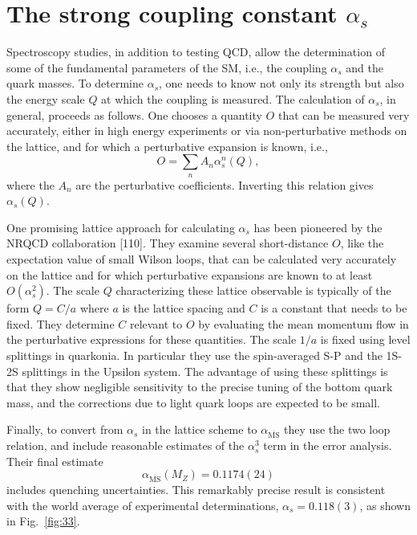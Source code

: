 \chapter{The strong coupling constant $\alpha_s$}

Spectroscopy studies, in addition to testing QCD, allow the determination of some of the fundamental parameters of the SM, i.e., the coupling $\alpha_s$ and the quark masses. To determine $\alpha_s$, one needs to know not only its strength but also the energy scale $Q$ at which the coupling is measured. The calculation of $\alpha_s$, in general, proceeds as follows. One chooses a quantity $O$ that can be measured very accurately, either in high energy experiments or via non-perturbative methods on the lattice, and for which a perturbative expansion is known, i.e.,
\begin{equation}
O = \sum_n A_n \alpha_s^n(Q),
\end{equation}
where the $A_n$ are the perturbative coefficients. Inverting this relation gives $\alpha_s(Q)$.

One promising lattice approach for calculating $\alpha_s$ has been pioneered by the NRQCD collaboration [110]. They examine several short-distance $O$, like the expectation value of small Wilson loops, that can be calculated very accurately on the lattice and for which perturbative expansions are known to at least $O(\alpha_s^2)$. The scale $Q$ characterizing these lattice observable is typically of the form $Q = C/a$ where $a$ is the lattice spacing and $C$ is a constant that needs to be fixed. They determine $C$ relevant to $O$ by evaluating the mean momentum flow in the perturbative expressions for these quantities. The scale $1/a$ is fixed using level splittings in quarkonia. In particular they use the spin-averaged S-P and the 1S-2S splittings in the Upsilon system. The advantage of using these splittings is that they show negligible sensitivity to the precise tuning of the bottom quark mass, and the corrections due to light quark loops are expected to be small.

Finally, to convert from $\alpha_s$ in the lattice scheme to $\alpha_{\overline{\mathrm{MS}}}$ they use the two loop relation, and include reasonable estimates of the $\alpha_s^3$ term in the error analysis. Their final estimate
\begin{equation}
\alpha_{\overline{\mathrm{MS}}}(M_Z) = 0.1174(24)
\end{equation}
includes quenching uncertainties. This remarkably precise result is consistent with the world average of experimental determinations, $\alpha_s = 0.118(3)$, as shown in Fig.~\ref{fig:33}.


